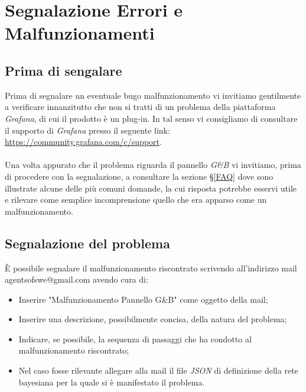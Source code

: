 \section{Segnalazione Errori e Malfunzionamenti}\label{Segnalazione}

\subsection{Prima di sengalare}\label{BeforeReport}
Prima di segnalare un eventuale bug\glossario o malfunzionamento vi invitiamo gentilmente a verificare innanzitutto che non si tratti di un problema della piattaforma \textit{Grafana}, di cui il prodotto è un plug-in. In tal senso vi consigliamo di consultare il supporto di \textit{Grafana} presso il seguente link: \url{https://community.grafana.com/c/support}.\\
~\\
Una volta appurato che il problema riguarda il pannello \textit{G\&B} vi invitiamo, prima di procedere con la segnalazione, a consultare la sezione §\ref{FAQ} dove sono illustrate alcune delle più comuni domande, la cui risposta potrebbe esservi utile e rilevare come semplice incomprensione quello che era apparso come un malfunzionamento.

\subsection{Segnalazione del problema}\label{Report}
È possibile segnalare il malfunzionamento riscontrato scrivendo all'indirizzo mail agentsofswe@gmail.com avendo cura di:
\begin{itemize}
	\item Inserire "Malfunzionamento Pannello G\&B" come oggetto della mail;
	\item Inserire una descrizione, possibilmente concisa, della natura del problema;
	\item Indicare, se possibile, la sequenza di passaggi che ha condotto al malfunzionamento riscontrato;
	\item Nel caso fosse rilevante allegare alla mail il file \textit{JSON} di definizione della rete bayesiana per la quale si è manifestato il problema.
\end{itemize}
